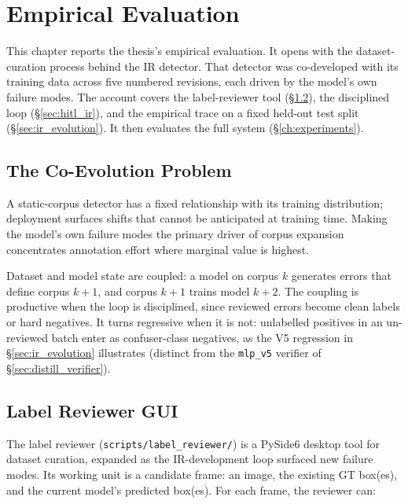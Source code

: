 \chapter{Empirical Evaluation}
\label{ch:hitl}

This chapter reports the thesis's empirical evaluation. It opens with the dataset-curation process behind the IR detector. That detector was co-developed with its training data across five numbered revisions, each driven by the model's own failure modes. The account covers the label-reviewer tool (\S\ref{sec:label_reviewer}), the disciplined loop (\S\ref{sec:hitl_ir}), and the empirical trace on a fixed held-out test split (\S\ref{sec:ir_evolution}). It then evaluates the full system (\S\ref{ch:experiments}).

\section{The Co-Evolution Problem}
\label{sec:coevolution}

A static-corpus detector has a fixed relationship with its training distribution; deployment surfaces shifts that cannot be anticipated at training time. Making the model's own failure modes the primary driver of corpus expansion concentrates annotation effort where marginal value is highest.

Dataset and model state are coupled: a model on corpus $k$ generates errors that define corpus $k+1$, and corpus $k+1$ trains model $k+2$. The coupling is productive when the loop is disciplined, since reviewed errors become clean labels or hard negatives. It turns regressive when it is not: unlabelled positives in an un-reviewed batch enter as confuser-class negatives, as the V5 regression in \S\ref{sec:ir_evolution} illustrates (distinct from the \texttt{mlp\_v5} verifier of \S\ref{sec:distill_verifier}).

\section{Label Reviewer GUI}
\label{sec:label_reviewer}

The label reviewer (\texttt{scripts/label\_reviewer/}) is a PySide6 desktop tool for dataset curation, expanded as the IR-development loop surfaced new failure modes. Its working unit is a candidate frame: an image, the existing GT box(es), and the current model's predicted box(es). For each frame, the reviewer can:

